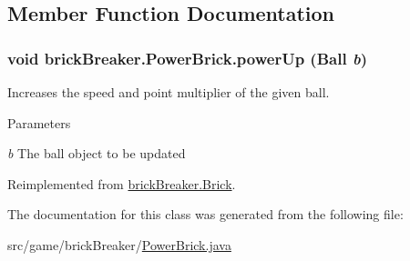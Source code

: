 \subsection{Member Function Documentation}
\hypertarget{classbrick_breaker_1_1_power_brick_aa5f41bb48fc63ed441ec2e9892ccdac3}{
\subsubsection[{powerUp}]{\setlength{\rightskip}{0pt plus 5cm}void brickBreaker.PowerBrick.powerUp ({\bf Ball} {\em b})}}
\label{classbrick_breaker_1_1_power_brick_aa5f41bb48fc63ed441ec2e9892ccdac3}
Increases the speed and point multiplier of the given ball. 
\begin{DoxyParams}{Parameters}
\item[{\em b}]The ball object to be updated \end{DoxyParams}


Reimplemented from \hyperlink{classbrick_breaker_1_1_brick_a109d6d8023e528284c1726ee55c3e50e}{brickBreaker.Brick}.



The documentation for this class was generated from the following file:\begin{DoxyCompactItemize}
\item 
src/game/brickBreaker/\hyperlink{_power_brick_8java}{PowerBrick.java}\end{DoxyCompactItemize}
